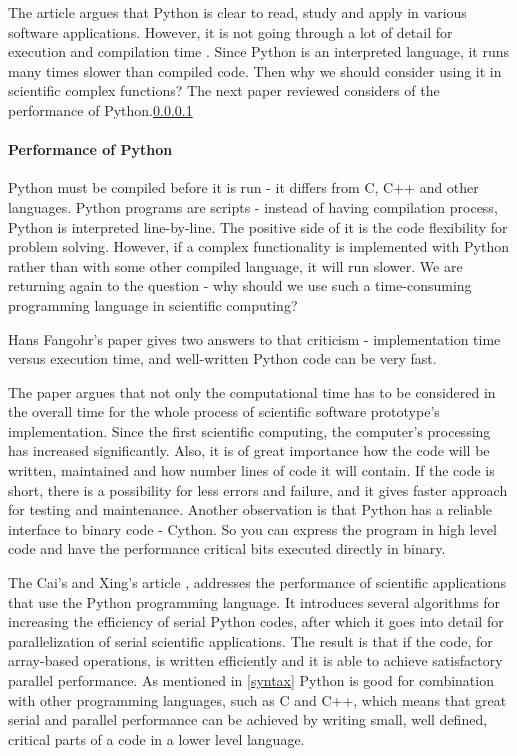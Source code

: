 The article argues that Python is clear to read, study and apply in various software applications. However, it is not going through a lot of detail for execution and compilation time \cite{HansPython}. Since Python is an interpreted language, it runs many times slower than compiled code. Then why we should consider using it in scientific complex functions? The next paper reviewed considers of the performance of Python.\ref{performance}

\vspace{2mm}
\paragraph{Performance of Python}
\label{performance}
\vspace{3mm}

Python must be compiled before it is run - it differs from C, C++ and other languages. Python programs are scripts - instead of having compilation process, Python is interpreted line-by-line. The positive side of it is the code flexibility for problem solving. However, if a complex functionality is implemented with Python rather than with some other compiled language, it will run slower. We are returning again to the question - why should we use such a time-consuming programming language in scientific computing? \cite{ScottPython}

 Hans Fangohr's paper \cite{HansPython} gives two answers to that criticism - implementation time versus execution time, and well-written Python code can be very fast.

The paper argues that not only the computational time has to be considered in the overall time for the whole process of scientific software prototype's implementation. Since the first scientific computing, the computer's processing has increased significantly. Also, it is of great importance how the code will be written, maintained and how number lines of code it will contain. If the code is short, there is a possibility for less errors and failure, and it gives faster approach for testing and maintenance. Another observation is that Python has a reliable interface to binary code - Cython.  So you can express the program in high level code and have the performance critical bits executed directly in binary.

The Cai's and Xing's article \cite{cai2005performance}, addresses the performance of scientific applications that use the Python programming language. It introduces several algorithms for increasing the efficiency of serial Python codes, after which it goes into detail for parallelization of serial scientific applications. The result is that if the code, for array-based operations, is written efficiently and it is able to achieve satisfactory parallel performance. As mentioned in \ref{syntax} Python is good for combination with other programming languages, such as C and C++, which means that great serial and parallel performance can be achieved by writing small, well defined, critical parts of a code in a lower level language. 

